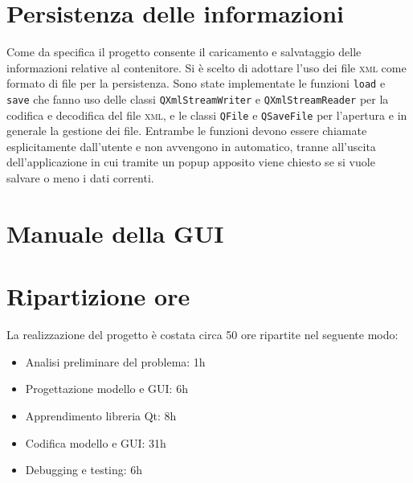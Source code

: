     \section*{Persistenza delle informazioni}
        Come da specifica il progetto consente il caricamento e salvataggio delle informazioni relative al contenitore. Si è scelto di adottare l'uso dei file \textsc{xml} come formato di file per la persistenza. \newline
        Sono state implementate le funzioni \texttt{load} e \texttt{save} che fanno uso delle classi \texttt{QXmlStreamWriter} e \texttt{QXmlStreamReader} per la codifica e decodifica del file \textsc{xml}, e le classi \texttt{QFile} e \texttt{QSaveFile} per l'apertura e in generale la gestione dei file. \newline
        Entrambe le funzioni devono essere chiamate esplicitamente dall'utente e non avvengono in automatico, tranne all'uscita dell'applicazione in cui tramite un popup apposito viene chiesto se si vuole salvare o meno i dati correnti.


    \section*{Manuale della GUI}
        

    \section*{Ripartizione ore}
        La realizzazione del progetto è costata circa 50 ore ripartite nel seguente modo:
        \begin{itemize}
            \item Analisi preliminare del problema: 1h
            \item Progettazione modello e GUI: 6h
            \item Apprendimento libreria Qt: 8h
            \item Codifica modello e GUI: 31h
            \item Debugging e testing: 6h
        \end{itemize}

